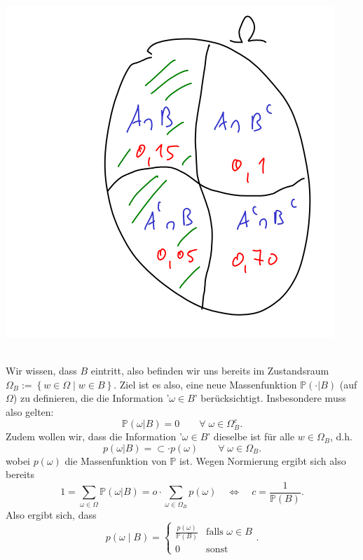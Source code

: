 \begin{example}
\begin{minipage}{\textwidth}
\begin{minipage}{0.5\textwidth}
            \includegraphics[scale=0.2]{figures/Bedingte Wahrscheinlichkeit.png}
        \end{minipage}
    \end{minipage}
    \\
    Wir wissen, dass $B$ eintritt, also befinden wir uns bereits im Zustandsraum  $\Omega_B := \left \{w\in \Omega \mid  w\in B\right\} $. Ziel ist es also, eine neue Massenfunktion $\mathbb{P}(\cdot |B)$ (auf $\Omega$) zu definieren, die die Information '$\omega\in B$' berücksichtigt. Insbesondere muss also gelten:
    \[
        \mathbb{P}(\omega | B) = 0 \qquad \forall\; \omega\in \Omega_B^{c}
    .\] 
    Zudem wollen wir, dass die Information '$\omega \in B$' dieselbe ist für alle $w\in \Omega_B$, d.h.
    \[
        p(\omega|B) = \subset \cdot p(\omega) \qquad \forall \; \omega\in \Omega_B
    .\] 
    wobei $p(\omega)$ die Massenfunktion von $\mathbb{P}$ ist. Wegen Normierung ergibt sich also bereits
    \[
        1 = \sum_{\omega\in \Omega} \mathbb{P}(\omega|B) = o\cdot \sum_{\omega\in \Omega_B} p(\omega) \quad \iff  \quad c = \frac{1}{\mathbb{P}(B)}
    .\] 
    Also ergibt sich, dass 
    \[
        p(\omega\mid B) = \begin{cases}
            \frac{p(\omega)}{\mathbb{P}(B)} & \text{falls } \omega\in B \\
            0 & \text{sonst}
        \end{cases}
    .\] 

\end{example}
